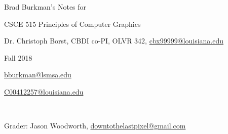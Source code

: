 \documentclass[12pt]{article}
\begin{document}
\setlength{\parindent}{0pt}
\begin{spacing}{1.2}

Brad Burkman's Notes for

\qquad CSCE 515 Principles of Computer Graphics

\qquad Dr. Christoph Borst, CBDI co-PI, 
OLVR 342, 
\url{cbx99999@louisiana.edu}

\qquad Fall 2018

\url{bburkman@lsmsa.edu}

\url{C00412257@louisiana.edu}

\

Grader:  Jason Woodworth, \url{downtothelastpixel@gmail.com}

\tableofcontents


















%
%

\end{spacing}
\end{document}
